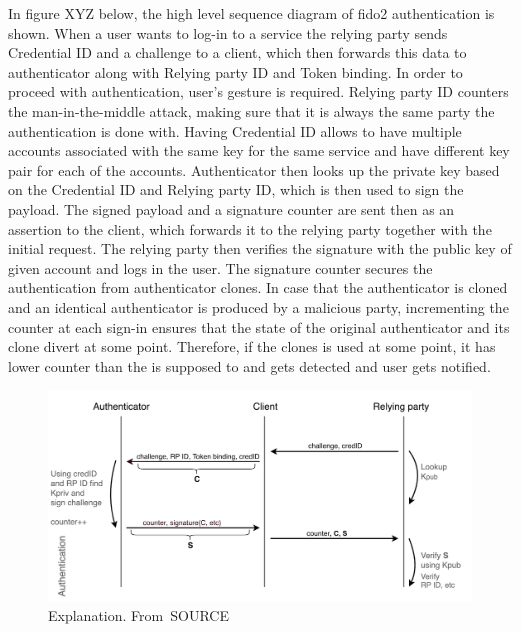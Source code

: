 In figure XYZ below, the high level sequence diagram of \acrshort{fido}2 authentication is shown. When a user wants to log-in to a service the relying party sends Credential ID and a challenge to a client, which then forwards this data to authenticator along with Relying party ID and Token binding. In order to proceed with authentication, user's gesture is required. Relying party ID counters the man-in-the-middle attack, making sure that it is always the same party the authentication is done with. Having Credential ID allows to have multiple accounts associated with the same key for the same service and have different key pair for each of the accounts. Authenticator then looks up the private key based on the Credential ID and Relying party ID, which is then used to sign the payload. The signed payload and a signature counter are sent then as an assertion to the client, which forwards it to the relying party together with the initial request. The relying party then verifies the signature with the public key of given account and logs in the user. The signature counter secures the authentication from authenticator clones. In case that the authenticator is cloned and an identical authenticator is produced by a malicious party, incrementing the counter at each sign-in ensures that the state of the original authenticator and its clone divert at some point. Therefore, if the clones is used at some point, it has lower counter than the is supposed to and gets detected and user gets notified.

\begin{figure}[ht]
    \centering
    \includegraphics[width=.95\textwidth]{00images/FIDO2_Authentication.png}
    \caption{Explanation. From~\cite{}SOURCE}
    \label{fig:fido2_authentication}
\end{figure}